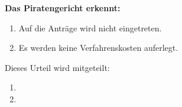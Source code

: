 \documentclass[notitlepage]{scrartcl}
\begin{document}
\maketitle

\newpage

\begin{numbering}



\NN{\anonhans}{\lipsum[12]}



\newpage
{}

\textbf{Das Piratengericht erkennt:}

\begin{enumerate}
\item Auf die Anträge wird nicht eingetreten.
\item Es werden keine Verfahrenskosten auferlegt.
\end{enumerate}

\vspace{0.2cm}
Dieses Urteil wird mitgeteilt:

\begin{enumerate}
\item \anonfritz
\item \anonhans
\end{enumerate}

\end{numbering}

\signature{Stefan Thöni, Präsident}

\appeal
\end{document}
